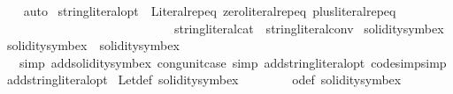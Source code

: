 \begin{isabellebody}
%
\isadelimproof
\ \ %
\endisadelimproof
%
\isatagproof
{}\isamarkupfalse%
\ auto%
\endisatagproof
{\isafoldproof}%
%
\isadelimproof
\isanewline
%
\endisadelimproof
\isanewline
{}\isamarkupfalse%
\ string{\isacharunderscore}{\kern0pt}literal{\isacharunderscore}{\kern0pt}opt\ {\isacharequal}{\kern0pt}\ Literal{\isachardot}{\kern0pt}rep{\isacharunderscore}{\kern0pt}eq\ zero{\isacharunderscore}{\kern0pt}literal{\isachardot}{\kern0pt}rep{\isacharunderscore}{\kern0pt}eq\ plus{\isacharunderscore}{\kern0pt}literal{\isachardot}{\kern0pt}rep{\isacharunderscore}{\kern0pt}eq\isanewline
\ \ \ \ \ \ \ \ \ \ \ \ \ \ \ \ \ \ \ \ \ \ \ \ \ \ \ \ string{\isacharunderscore}{\kern0pt}literal{\isacharunderscore}{\kern0pt}cat\ \ string{\isacharunderscore}{\kern0pt}literal{\isacharunderscore}{\kern0pt}conv\isanewline
\isanewline
{}\isamarkupfalse%
\ solidity{\isacharunderscore}{\kern0pt}symbex\isanewline
{}\isamarkupfalse%
\ solidity{\isacharunderscore}{\kern0pt}symbex\ \ solidity{\isacharunderscore}{\kern0pt}symbex\ {\isacharequal}{\kern0pt}\isanewline
\ \ \ {\isacharparenleft}{\kern0pt}{\isacharparenleft}{\kern0pt}simp\ add{\isacharcolon}{\kern0pt}solidity{\isacharunderscore}{\kern0pt}symbex\ cong{\isacharcolon}{\kern0pt}unit{\isachardot}{\kern0pt}case{\isacharparenright}{\kern0pt}{\isacharcomma}{\kern0pt}\ {\isacharparenleft}{\kern0pt}simp\ add{\isacharcolon}{\kern0pt}string{\isacharunderscore}{\kern0pt}literal{\isacharunderscore}{\kern0pt}opt{\isacharparenright}{\kern0pt}{\isacharquery}{\kern0pt}{\isacharsemicolon}{\kern0pt}\ {\isacharparenleft}{\kern0pt}code{\isacharunderscore}{\kern0pt}simp{\isacharbar}{\kern0pt}simp\ add{\isacharcolon}{\kern0pt}string{\isacharunderscore}{\kern0pt}literal{\isacharunderscore}{\kern0pt}opt{\isacharparenright}{\kern0pt}{\isacharplus}{\kern0pt}{\isacharparenright}{\kern0pt}\isanewline
\isanewline
{}\isamarkupfalse%
\ Let{\isacharunderscore}{\kern0pt}def\ {\isacharbrackleft}{\kern0pt}solidity{\isacharunderscore}{\kern0pt}symbex{\isacharbrackright}{\kern0pt}\isanewline
\ \ \ \ \ \ \ \ o{\isacharunderscore}{\kern0pt}def\ {\isacharbrackleft}{\kern0pt}solidity{\isacharunderscore}{\kern0pt}symbex{\isacharbrackright}{\kern0pt}\isanewline
%
\isadelimtheory
\isanewline
%
\endisadelimtheory
%
\isatagtheory
{}\isamarkupfalse%
%
\endisatagtheory
{\isafoldtheory}%
%
\isadelimtheory
%
\endisadelimtheory
%
\end{isabellebody}%
\endinput
